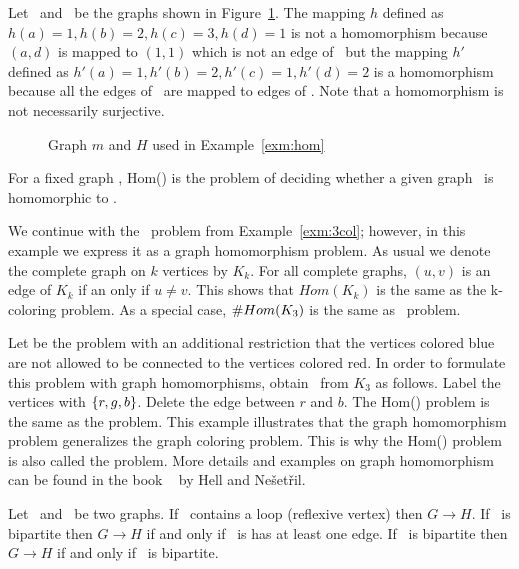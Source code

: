 \begin{example}\label{exm:hom}
Let \mG\ and \mH\ be the graphs shown in Figure~\ref{fig:hom}\@. The mapping \(h\)
defined as \(h(a)=1, h(b)=2, h(c)=3, h(d)=1\)
is not a homomorphism because \((a,d)\) is mapped to \((1,1)\) which is not an 
edge of \mH\ but the mapping \(h'\) defined as \(h'(a)=1, h'(b)=2, h'(c)=1, h'(d)=2\) 
is a homomorphism because all the edges of \mG\ are mapped to edges of \mH. 
Note that a homomorphism is not necessarily surjective.

\begin{figure}[h]
\center
\caption{Graph \ensuremath{m} and \ensuremath{H} used in Example~\ref{exm:hom}} \label{fig:hom}
\end{figure}
\end{example}

\begin{defi}[Hom(\mH)]
For a fixed graph \mH, Hom(\mH) is the problem of deciding whether a given graph \mG\
is homomorphic to \mH\@.
\end{defi}

\begin{example}[\tcoloring]
We continue with the \tcoloring\ problem from Example~\ref{exm:3col}; however, in this example 
we express it as a graph homomorphism problem. As usual we denote the complete graph
on \(k\) vertices by \(K_k\)\@. For all complete graphs, \((u,v)\) is an edge of \(K_k\)
if an only
if \(u\neq v\)\@. This shows that \(Hom(K_k)\) is the same as
the k-coloring problem. As a special case, \(\#Hom(K_3)\) is the same as \ctcol\ problem.
\end{example}

Let  be the  problem with an additional
restriction that the vertices colored blue are not allowed to be connected 
to the vertices colored red. In order to formulate this problem with graph homomorphisms,
obtain \mH\ from \(K_3\) as follows. Label the vertices with \(\{{r,g,b}\}\)\@.
Delete the edge between \(r\) and \(b\). The Hom(\mH) problem is the same as
the \pname{N0RB-3-Coloring} problem.
This example illustrates that the graph homomorphism problem generalizes the graph coloring problem.
This is why
the Hom(\mH) problem is also called the  problem.
More details and examples on graph homomorphism 
can be found in the book ~\cite{hellbook} by Hell and Ne\v{s}et\v{r}il.

\begin{obs}\label{obs:hom}
Let \mG\ and \mH\ be two graphs.
If \mH\ contains a loop (reflexive vertex) then \(G \to H\)\@.
If \mG\ is bipartite then \(G \to H\) if and only if \mH\ is has at least one edge.
If \mH\ is bipartite then \(G \to H\) if and only if \mG\ is bipartite.
\end{obs}

